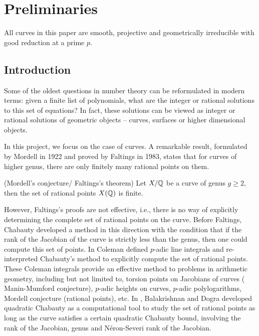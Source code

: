 \chapter{Preliminaries}

All curves in this paper are smooth, projective and geometrically irreducible with good reduction at a prime $p$.

\section{Introduction}

Some of the oldest questions in number theory can be reformulated in modern terms: given a finite list of polynomials, what are the integer or rational solutions to this set of equations? In fact, these solutions can be viewed as integer or rational solutions of geometric objects -- curves, surfaces or higher dimensional objects.

In this project, we focus on the case of curves. A remarkable result, formulated by Mordell in 1922 and proved by Faltings in 1983, states that for curves of higher genus, there are only finitely many rational points on them. 

\begin{theorem}{(Mordell's conjecture/ Faltings's theorem)} Let $X/\mathbb{Q}$ be a curve of genus $g \geq 2$, then the set of rational points $X(\mathbb{Q})$ is finite.
\end{theorem}

However, Faltings's proofs are not effective, i.e., there is no way of explicitly determining the complete set of rational points on the curve. Before Faltings, Chabauty developed a method in this direction with the condition that if the rank of the Jacobian of the curve is strictly less than the genus, then one could compute this set of points. In \cite{Coleman2,Coleman3} Coleman defined $p$-adic line integrals and re-interpreted Chabauty's method to explicitly compute the set of rational points. These Coleman integrals provide an effective method to problems in arithmetic geometry, including but not limited to, torsion points on Jacobians of curves ( Manin-Mumford conjecture), $p$-adic heights on curves, $p$-adic polylogarithms, Mordell conjecture (rational points), etc. In \cite{BD1,BD2}, Balakrishnan and Dogra developed quadratic Chabauty as a computational tool to study the set of rational points as long as the curve satisfies a certain quadratic Chabauty bound, involving the rank of the Jacobian, genus and N\'{e}ron-Severi rank of the Jacobian. 


